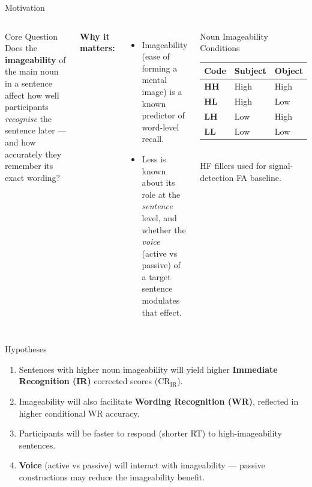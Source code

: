 \documentclass[aspectratio=169, 10pt]{beamer}
\begin{document}
\begin{frame}{Motivation}
  \begin{columns}[T]
      \begin{block}{Core Question}
        Does the \textbf{imageability} of the main noun in a sentence
        affect how well participants \emph{recognise} the sentence
        later — and how accurately they remember its exact wording? 
      \end{block}
      \vspace{0.5em}
      \textbf{Why it matters:}
      \begin{itemize}
        \item Imageability (ease of forming a mental image) is a
              known predictor of word-level recall.
        \item Less is known about its role at the \emph{sentence}
              level, and whether the \emph{voice} (active vs passive)
              of a target sentence modulates that effect.
      \end{itemize}

      \begin{block}{Noun Imageability Conditions}
        \begin{tabular}{lll}
          \toprule
          Code & Subject & Object \\
          \midrule
          \textbf{HH} & High & High \\
          \textbf{HL} & High & Low  \\
          \textbf{LH} & Low  & High \\
          \textbf{LL} & Low  & Low  \\
          \bottomrule
        \end{tabular}\\[4pt]
        \small HF fillers used for signal-detection FA baseline.
      \end{block}
  \end{columns}
\end{frame}

\begin{frame}{Hypotheses}
  \begin{enumerate}
    \item[\textbf{H1}] Sentences with higher noun imageability will
          yield higher \textbf{Immediate Recognition (IR)} corrected
          scores (CR$_\text{IR}$).
    \vspace{0.5em}
    \item[\textbf{H2}] Imageability will also facilitate
          \textbf{Wording Recognition (WR)}, reflected in higher
          conditional WR accuracy.
    \vspace{0.5em}
    \item[\textbf{H3}] Participants will be faster to respond (shorter
          RT) to high-imageability sentences.
    \vspace{0.5em}
    \item[\textbf{H4}] \textbf{Voice} (active vs passive) will interact
          with imageability — passive constructions may reduce the
          imageability benefit.
  \end{enumerate}
\end{frame}
\end{document}
